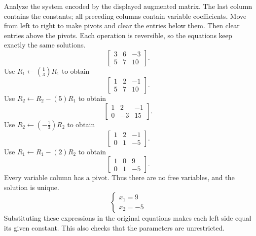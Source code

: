 \goal Analyze the system encoded by the displayed augmented matrix. The last column contains the constants; all preceding columns contain variable coefficients.
\idea Move from left to right to make pivots and clear the entries below them. Then clear entries above the pivots. Each operation is reversible, so the equations keep exactly the same solutions.
\[ \left[\begin{array}{rr|r}3&6&-3\\5&7&10\end{array}\right].\]
Use $R_{1}\leftarrow(\frac{1}{3})R_{1}$ to obtain
\[ \left[\begin{array}{rr|r}1&2&-1\\5&7&10\end{array}\right].\]
Use $R_{2}\leftarrow R_{2}-(5)R_{1}$ to obtain
\[ \left[\begin{array}{rr|r}1&2&-1\\0&-3&15\end{array}\right].\]
Use $R_{2}\leftarrow(- \frac{1}{3})R_{2}$ to obtain
\[ \left[\begin{array}{rr|r}1&2&-1\\0&1&-5\end{array}\right].\]
Use $R_{1}\leftarrow R_{1}-(2)R_{2}$ to obtain
\[ \left[\begin{array}{rr|r}1&0&9\\0&1&-5\end{array}\right].\]
Every variable column has a pivot. Thus there are no free variables, and the solution is unique.
\[ \begin{cases}x_{1}=9\\x_{2}=-5\end{cases}\]
Substituting these expressions in the original equations makes each left side equal its given constant. This also checks that the parameters are unrestricted.

